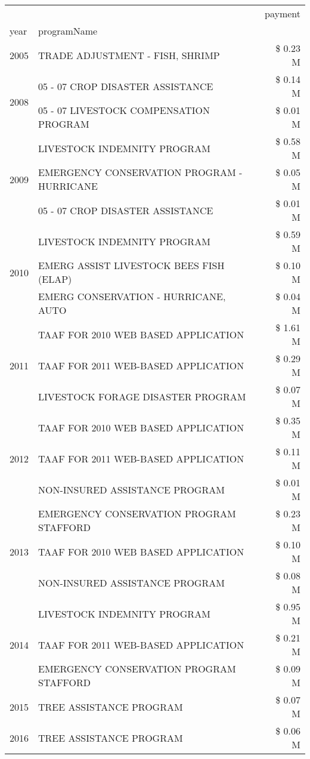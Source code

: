 \begin{tabular}{llr}
\toprule
 &  & payment \\
year & programName &  \\
\midrule
2005 & TRADE ADJUSTMENT - FISH, SHRIMP & \$ 0.23 M \\
\cline{1-3}
\multirow[t]{2}{*}{2008} & 05 - 07 CROP DISASTER ASSISTANCE & \$ 0.14 M \\
 & 05 - 07 LIVESTOCK COMPENSATION PROGRAM & \$ 0.01 M \\
\cline{1-3}
\multirow[t]{3}{*}{2009} & LIVESTOCK INDEMNITY PROGRAM & \$ 0.58 M \\
 & EMERGENCY CONSERVATION PROGRAM - HURRICANE & \$ 0.05 M \\
 & 05 - 07 CROP DISASTER ASSISTANCE & \$ 0.01 M \\
\cline{1-3}
\multirow[t]{3}{*}{2010} & LIVESTOCK INDEMNITY PROGRAM & \$ 0.59 M \\
 & EMERG ASSIST LIVESTOCK BEES FISH (ELAP) & \$ 0.10 M \\
 & EMERG CONSERVATION - HURRICANE, AUTO & \$ 0.04 M \\
\cline{1-3}
\multirow[t]{3}{*}{2011} & TAAF FOR 2010 WEB BASED APPLICATION & \$ 1.61 M \\
 & TAAF FOR 2011 WEB-BASED APPLICATION & \$ 0.29 M \\
 & LIVESTOCK FORAGE DISASTER PROGRAM & \$ 0.07 M \\
\cline{1-3}
\multirow[t]{3}{*}{2012} & TAAF FOR 2010 WEB BASED APPLICATION & \$ 0.35 M \\
 & TAAF FOR 2011 WEB-BASED APPLICATION & \$ 0.11 M \\
 & NON-INSURED ASSISTANCE PROGRAM & \$ 0.01 M \\
\cline{1-3}
\multirow[t]{3}{*}{2013} & EMERGENCY CONSERVATION PROGRAM STAFFORD & \$ 0.23 M \\
 & TAAF FOR 2010 WEB BASED APPLICATION & \$ 0.10 M \\
 & NON-INSURED ASSISTANCE PROGRAM & \$ 0.08 M \\
\cline{1-3}
\multirow[t]{3}{*}{2014} & LIVESTOCK INDEMNITY PROGRAM & \$ 0.95 M \\
 & TAAF FOR 2011 WEB-BASED APPLICATION & \$ 0.21 M \\
 & EMERGENCY CONSERVATION PROGRAM STAFFORD & \$ 0.09 M \\
\cline{1-3}
2015 & TREE ASSISTANCE PROGRAM & \$ 0.07 M \\
\cline{1-3}
\multirow[t]{3}{*}{2016} & TREE ASSISTANCE PROGRAM & \$ 0.06 M \\

\end{tabular}
